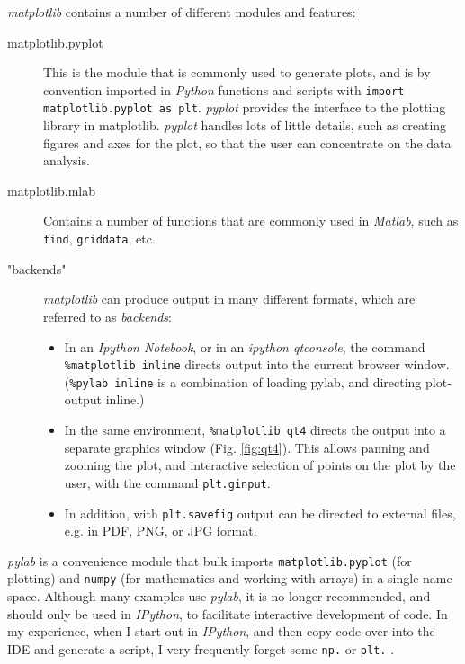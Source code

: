 \emph{matplotlib} contains a number of different modules and features:
\begin{description}
  \item[matplotlib.pyplot] This is the module that is commonly used to generate plots, and is by convention imported in \emph{Python} functions and scripts with \lstinline{import matplotlib.pyplot as plt}. \emph{pyplot}  provides the interface to the plotting library in matplotlib. \emph{pyplot} handles lots of little details, such as creating figures and axes for the plot, so that the user can concentrate on the data analysis.
  
    \item[matplotlib.mlab] Contains a number of functions that are commonly used in \emph{Matlab}, such as \lstinline{find}, \lstinline{griddata}, etc.

  \item["backends"] \emph{matplotlib} can produce output in many different formats, which are referred to as \emph{backends}:
    \begin{itemize}
      \item In an \emph{Ipython Notebook}, or in an \emph{ipython qtconsole}, the command \lstinline{%matplotlib inline} directs output into the current browser window. (\lstinline{%pylab inline} is a combination of loading pylab, and directing plot-output inline.)
      \item In the same environment, \lstinline{%matplotlib qt4} directs the output into a separate graphics window (Fig. \ref{fig:qt4}). This allows panning and zooming the plot, and interactive selection of points on the plot by the user, with the command \lstinline{plt.ginput}.

      \item In addition, with \lstinline{plt.savefig} output can be directed to external files, e.g. in PDF, PNG, or JPG format.
    \end{itemize}
\end{description}

\emph{pylab} is a convenience module that bulk imports \lstinline{matplotlib.pyplot} (for plotting) and \lstinline{numpy} (for mathematics and working with arrays) in a single name space. Although many examples use \emph{pylab}, it is no longer recommended, and should only be used in \emph{IPython}, to facilitate interactive development of code. In my experience, when I start out in \emph{IPython}, and then copy code over into the IDE and generate a script, I very frequently forget some \lstinline{np.} or \lstinline{plt.} .


